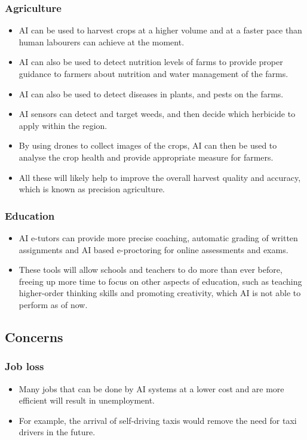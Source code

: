 \documentclass[11pt]{article}
\begin{document}
\subsubsection{Agriculture}
\label{sec:org9761d9d}
\begin{itemize}
\item AI can be used to harvest crops at a higher volume and at a faster pace than human labourers can achieve at the moment.
\item AI can also be used to detect nutrition levels of farms to provide proper guidance to farmers about nutrition and water management of the farms.
\item AI can also be used to detect diseases in plants, and pests on the farms.
\item AI sensors can detect and target weeds, and then decide which herbicide to apply within the region.
\item By using drones to collect images of the crops, AI can then be used to analyse the crop health and provide appropriate measure for farmers.
\item All these will likely help to improve the overall harvest quality and accuracy, which is known as precision agriculture.
\end{itemize}
\subsubsection{Education}
\label{sec:org36b8be1}
\begin{itemize}
\item AI e-tutors can provide more precise coaching, automatic grading of written assignments and AI based e-proctoring for online assessments and exams.
\item These tools will allow schools and teachers to do more than ever before, freeing up more time to focus on other aspects of education, such as teaching higher-order thinking skills and promoting creativity, which AI is not able to perform as of now.
\end{itemize}
\subsection{Concerns}
\label{sec:orgf294b37}

\subsubsection{Job loss}
\label{sec:org9216048}
\begin{itemize}
\item Many jobs that can be done by AI systems at a lower cost and are more efficient will result in unemployment.
\item For example, the arrival of self-driving taxis would remove the need for taxi drivers in the future.
\end{itemize}
\end{document}
